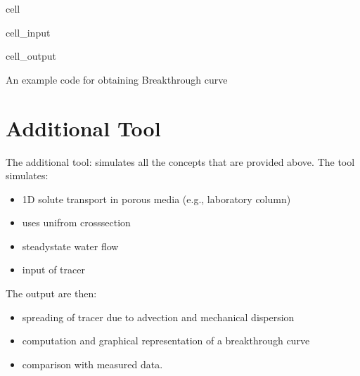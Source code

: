\documentclass[letterpaper,10pt,english]{jupyterBook}
\begin{document}
\begin{sphinxuseclass}{cell}
\begin{sphinxVerbatimInput}
\begin{sphinxuseclass}{cell_input}
\begin{sphinxVerbatim}[commandchars=\\\{\}]
 
\end{sphinxVerbatim}

\end{sphinxuseclass}\end{sphinxVerbatimInput}
\begin{sphinxVerbatimOutput}

\begin{sphinxuseclass}{cell_output}
\begin{sphinxVerbatim}[commandchars=\\\{\}]
An example code for obtaining Breakthrough curve 
\end{sphinxVerbatim}

\noindent{}

\end{sphinxuseclass}\end{sphinxVerbatimOutput}

\end{sphinxuseclass}

\section{Additional Tool}
\label{\detokenize{content/transport/L9/21_conservative_transport:additional-tool}}
\sphinxAtStartPar
The additional tool:  simulates all the concepts that are provided above. The tool simulates:
\begin{itemize}
\item {} 
\sphinxAtStartPar
1D solute transport in porous media (e.g., laboratory column)

\item {} 
\sphinxAtStartPar
uses unifrom cross\sphinxhyphen{}section

\item {} 
\sphinxAtStartPar
steady\sphinxhyphen{}state water flow

\item {} 
\sphinxAtStartPar
input of tracer

\end{itemize}

\sphinxAtStartPar
The output are then:
\begin{itemize}
\item {} 
\sphinxAtStartPar
spreading of tracer due to advection and mechanical dispersion

\item {} 
\sphinxAtStartPar
computation and graphical representation of a breakthrough curve

\item {} 
\sphinxAtStartPar
comparison with measured data.

\end{itemize}
\end{document}
